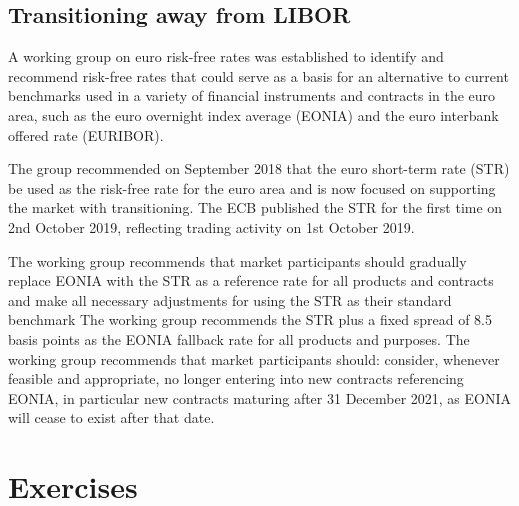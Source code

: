 \subsection{Transitioning away from LIBOR~\cite{bib:str}}
A working group on euro risk-free rates was established to identify
and recommend risk-free rates that could serve as a basis for an
alternative to current benchmarks used in a variety of financial
instruments and contracts in the euro area, such as the euro
overnight index average (EONIA) and the euro interbank offered rate
(EURIBOR). 

The group recommended on September 2018 that the euro
short-term rate (STR) be used as the risk-free rate for the euro area
and is now focused on supporting the market with transitioning.
The ECB published the STR for the first time on 2nd October 2019,
reflecting trading activity on 1st October 2019.

The working group recommends that market participants should gradually replace
EONIA with the STR as a reference rate for all products and
contracts and make all necessary adjustments for using the STR as
their standard benchmark
The working group recommends the STR plus a fixed spread of 8.5
basis points as the EONIA fallback rate for all products and purposes.
The working group recommends that market participants should:
consider, whenever feasible and appropriate, no longer entering into
new contracts referencing EONIA, in particular new contracts
maturing after 31 December 2021, as EONIA will cease to exist after
that date.


\section{Exercises}


